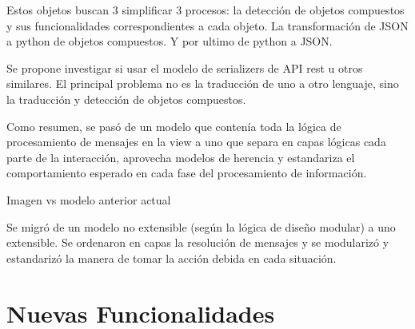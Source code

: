         \par Estos objetos buscan 3 simplificar 3 procesos: la detección de objetos compuestos y sus funcionalidades correspondientes a cada objeto. La transformación de JSON a python de objetos compuestos. Y por ultimo de python a JSON.
        \par Se propone investigar si usar el modelo de serializers de API rest u otros similares. El principal problema no es la traducción de uno a otro lenguaje, sino la traducción y detección de objetos compuestos.

        \par Como resumen, se pasó de un modelo que contenía toda la lógica de procesamiento de mensajes en la view a uno que separa en capas lógicas cada parte de la interacción, aprovecha modelos de herencia y estandariza el comportamiento esperado en cada fase del procesamiento de información.

        Imagen vs modelo anterior actual












    \par Se migró de un modelo no extensible (según la lógica de diseño modular) a uno extensible. Se ordenaron en capas la resolución de mensajes y se modularizó y estandarizó la manera de tomar la acción debida en cada situación.

\section{Nuevas Funcionalidades}
